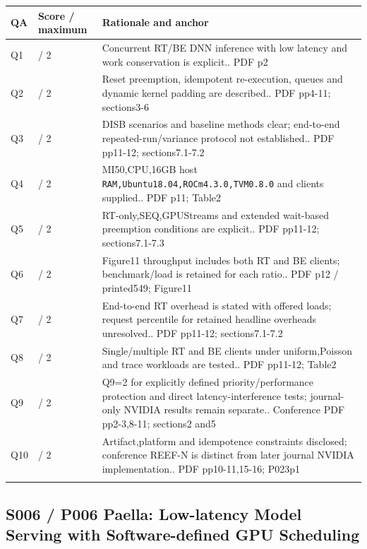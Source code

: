 \begin{longtable}{>{\raggedright\arraybackslash}p{}>{\raggedright\arraybackslash}p{}>{\raggedright\arraybackslash}p{}}
\toprule
\textbf{QA} & \textbf{Score / maximum} & \textbf{Rationale and anchor}\\\midrule\endhead
Q1 & 2 / 2 & Concurrent RT/BE DNN inference with low latency and work conservation is explicit.. PDF p2\\\addlinespace
Q2 & 2 / 2 & Reset preemption, idempotent re-execution, queues and dynamic kernel padding are described.. PDF pp4-11; sections3-6\\\addlinespace
Q3 & 1 / 2 & DISB scenarios and baseline methods clear; end-to-end repeated-run/variance protocol not established.. PDF pp11-12; sections7.1-7.2\\\addlinespace
Q4 & 2 / 2 & MI50,CPU,16GB host \nolinkurl{RAM,Ubuntu18.04,ROCm4.3.0,TVM0.8.0} and clients supplied.. PDF p11; Table2\\\addlinespace
Q5 & 2 / 2 & RT-only,SEQ,GPUStreams and extended wait-based preemption conditions are explicit.. PDF pp11-12; sections7.1-7.3\\\addlinespace
Q6 & 2 / 2 & Figure11 throughput includes both RT and BE clients; benchmark/load is retained for each ratio.. PDF p12 / printed549; Figure11\\\addlinespace
Q7 & 1 / 2 & End-to-end RT overhead is stated with offered loads; request percentile for retained headline overheads unresolved.. PDF pp11-12; sections7.1-7.2\\\addlinespace
Q8 & 2 / 2 & Single/multiple RT and BE clients under uniform,Poisson and trace workloads are tested.. PDF pp11-12; Table2\\\addlinespace
Q9 & 2 / 2 & Q9=2 for explicitly defined priority/performance protection and direct latency-interference tests; journal-only NVIDIA results remain separate.. Conference PDF pp2-3,8-11; sections2 and5\\\addlinespace
Q10 & 2 / 2 & Artifact,platform and idempotence constraints disclosed; conference REEF-N is distinct from later journal NVIDIA implementation.. PDF pp10-11,15-16; P023p1\\\addlinespace
\bottomrule\end{longtable}

\clearpage\subsection{S006 / P006 Paella: Low-latency Model Serving with Software-defined GPU Scheduling}

